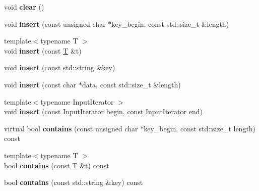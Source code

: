 \begin{DoxyCompactItemize}
void {\bfseries clear} ()
\item 
\mbox{\label{classfc_1_1bloom__filter_a024a01a04bcfef5c6fb20c0a29022b08}} 
void {\bfseries insert} (const unsigned char $\ast$key\+\_\+begin, const std\+::size\+\_\+t \&length)
\item 
\mbox{\label{classfc_1_1bloom__filter_a64116c7139c55bfbea36662e5c5e5c91}} 
{\footnotesize template$<$typename T $>$ }\\void {\bfseries insert} (const \mbox{\hyperlink{struct_t}{T}} \&t)
\item 
\mbox{\label{classfc_1_1bloom__filter_a4094b9d7a34d14c55d1cf61be2d6d019}} 
void {\bfseries insert} (const std\+::string \&key)
\item 
\mbox{\label{classfc_1_1bloom__filter_a6573afbce511a80567622577f26808f6}} 
void {\bfseries insert} (const char $\ast$data, const std\+::size\+\_\+t \&length)
\item 
\mbox{\label{classfc_1_1bloom__filter_a9c3b1a6d79deb07f906e836dd97ee696}} 
{\footnotesize template$<$typename Input\+Iterator $>$ }\\void {\bfseries insert} (const Input\+Iterator begin, const Input\+Iterator end)
\item 
\mbox{\label{classfc_1_1bloom__filter_a7a533ef13bc53b922afe050c23bd7095}} 
virtual bool {\bfseries contains} (const unsigned char $\ast$key\+\_\+begin, const std\+::size\+\_\+t length) const
\item 
\mbox{\label{classfc_1_1bloom__filter_a8d8fa605fe3266a8381b3d89bd39dbf0}} 
{\footnotesize template$<$typename T $>$ }\\bool {\bfseries contains} (const \mbox{\hyperlink{struct_t}{T}} \&t) const
\item 
\mbox{\label{classfc_1_1bloom__filter_a8cfa671af82c4429140315c16312f8f2}} 
bool {\bfseries contains} (const std\+::string \&key) const
\item 
\mbox{\label{classfc_1_1bloom__filter_a804653831725e9cf0fa9d6e7172c92e0}} 

\end{DoxyCompactItemize}
